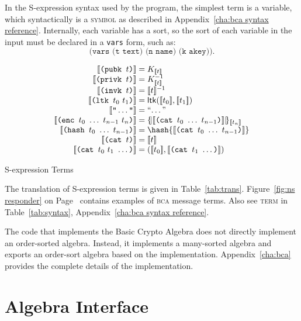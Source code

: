 \documentclass[12pt]{report}
\theoremstyle{definition}
\begin{document}
In the S-expression syntax used by the program, the simplest term is a
variable, which syntactically is a \textsc{symbol} as described in
Appendix~\ref{cha:bca syntax reference}.  Internally, each variable
has a sort, so the sort of each variable in the input must be declared
in a \texttt{vars} form, such as:
$$\texttt{(vars (t text) (n name) (k akey))}.$$

\begin{table}
$$\begin{array}{r@{}c@{}l}
\sembrack{\texttt{(pubk~}t\texttt{)}}&{}={}&K_{\sembrack{t}}\\
\sembrack{\texttt{(privk~}t\texttt{)}}&{}={}&K_{\sembrack{t}}^{-1}\\
\sembrack{\texttt{(invk~}t\texttt{)}}&{}={}&\sembrack{t}^{-1}\\
\sembrack{\texttt{(ltk~}t_0~t_1\texttt{)}}&{}={}&
\cn{ltk}(\sembrack{t_0},\sembrack{t_1})\\
\sembrack{\texttt{"}\ldots\texttt{"}}&{}={}&\mbox{``\ldots''}\\
\sembrack{\texttt{(enc~}t_0~\ldots~t_{n-1}~t_n\texttt{)}}&{}={}&
\enc{\sembrack{\texttt{(cat~}t_0~\ldots~t_{n-1}\texttt{)}}}{\sembrack{t_n}}\\
\sembrack{\texttt{(hash~}t_0~\ldots~t_{n-1}\texttt{)}}&{}={}&
\hash{\sembrack{\texttt{(cat~}t_0~\ldots~t_{n-1}\texttt{)}}}\\
\sembrack{\texttt{(cat~}t\texttt{)}}&{}={}&\sembrack{t}\\
\sembrack{\texttt{(cat~}t_0~t_1~\ldots\texttt{)}}&{}={}&
(\sembrack{t_0},\sembrack{\texttt{(cat~}t_1~\ldots\texttt{)}})

\end{array}$$
\caption{S-expression Terms}\label{tab:trans}
\end{table}

The translation of S-expression terms is given in
Table~\ref{tab:trans}.  Figure~\ref{fig:ns responder} on
Page~\pageref{fig:ns responder} contains examples of \textsc{bca}
message terms.  Also see \textsc{term} in Table~\ref{tab:syntax},
Appendix~\ref{cha:bca syntax reference}.

The code that implements the Basic Crypto Algebra does not directly
implement an order-sorted algebra.  Instead, it implements a
many-sorted algebra and exports an order-sort algebra based on the
implementation.  Appendix~\ref{cha:bca} provides the complete details
of the implementation.

\section{Algebra Interface}
\end{document}
